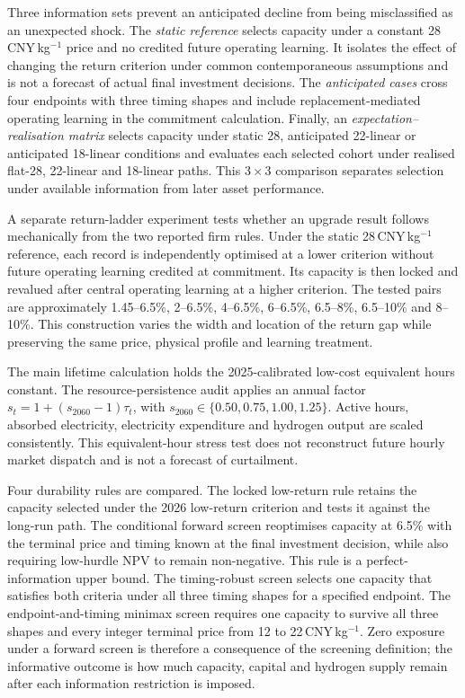 \documentclass[11pt,a4paper]{article}
\begin{document}
Three information sets prevent an anticipated decline from being misclassified as an unexpected shock. The \emph{static reference} selects capacity under a constant 28\,CNY\,kg$^{-1}$ price and no credited future operating learning. It isolates the effect of changing the return criterion under common contemporaneous assumptions and is not a forecast of actual final investment decisions. The \emph{anticipated cases} cross four endpoints with three timing shapes and include replacement-mediated operating learning in the commitment calculation. Finally, an \emph{expectation--realisation matrix} selects capacity under static 28, anticipated 22-linear or anticipated 18-linear conditions and evaluates each selected cohort under realised flat-28, 22-linear and 18-linear paths. This $3\times3$ comparison separates selection under available information from later asset performance.

A separate return-ladder experiment tests whether an upgrade result follows mechanically from the two reported firm rules. Under the static 28\,CNY\,kg$^{-1}$ reference, each record is independently optimised at a lower criterion without future operating learning credited at commitment. Its capacity is then locked and revalued after central operating learning at a higher criterion. The tested pairs are approximately 1.45--6.5\%, 2--6.5\%, 4--6.5\%, 6--6.5\%, 6.5--8\%, 6.5--10\% and 8--10\%. This construction varies the width and location of the return gap while preserving the same price, physical profile and learning treatment.

The main lifetime calculation holds the 2025-calibrated low-cost equivalent hours constant. The resource-persistence audit applies an annual factor $s_t=1+(s_{2060}-1)\tau_t$, with $s_{2060}\in\{0.50,0.75,1.00,1.25\}$. Active hours, absorbed electricity, electricity expenditure and hydrogen output are scaled consistently. This equivalent-hour stress test does not reconstruct future hourly market dispatch and is not a forecast of curtailment.

Four durability rules are compared. The locked low-return rule retains the capacity selected under the 2026 low-return criterion and tests it against the long-run path. The conditional forward screen reoptimises capacity at 6.5\% with the terminal price and timing known at the final investment decision, while also requiring low-hurdle NPV to remain non-negative. This rule is a perfect-information upper bound. The timing-robust screen selects one capacity that satisfies both criteria under all three timing shapes for a specified endpoint. The endpoint-and-timing minimax screen requires one capacity to survive all three shapes and every integer terminal price from 12 to 22\,CNY\,kg$^{-1}$. Zero exposure under a forward screen is therefore a consequence of the screening definition; the informative outcome is how much capacity, capital and hydrogen supply remain after each information restriction is imposed.
\end{document}
